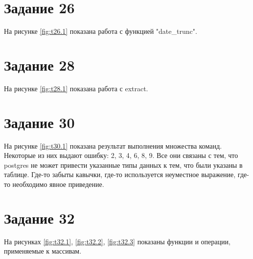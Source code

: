 \section{Задание 26}

На рисунке \ref{fig:t26.1} показана работа с функцией "date\_trunc".

\begin{myfigure}{26.1}
  \caption{Эксперименты с date\_trunc}
  \label{fig:t26.1}
\end{myfigure}

\section{Задание 28}

На рисунке \ref{fig:t28.1} показана работа с extract.

\begin{myfigure}{28.1}
  \caption{Применение extract}
  \label{fig:t28.1}
\end{myfigure}

\section{Задание 30}

На рисунке \ref{fig:t30.1} показана результат выполнения множества команд. Некоторые из них выдают ошибку: 2, 3, 4, 6, 8, 9. Все они связаны с тем, что postgres не может привести указанные типы данных к тем, что были указаны в таблице. Где-то забыты кавычки, где-то используется неуместное выражение, где-то необходимо явное приведение.

\begin{myfigure}{30.1}
  \caption{Результат выполнения множества команд}
  \label{fig:t30.1}
\end{myfigure}

\section{Задание 32}

На рисунках \ref{fig:t32.1}, \ref{fig:t32.2}, \ref{fig:t32.3} показаны функции и операции, применяемые к массивам.

\begin{myfigure}{32.1}
  \caption{Операции с массивами, часть 1}
  \label{fig:t32.1}
\end{myfigure}

\begin{myfigure}{32.2}
  \caption{Операции с массивами, часть 2}
  \label{fig:t32.2}
\end{myfigure}


